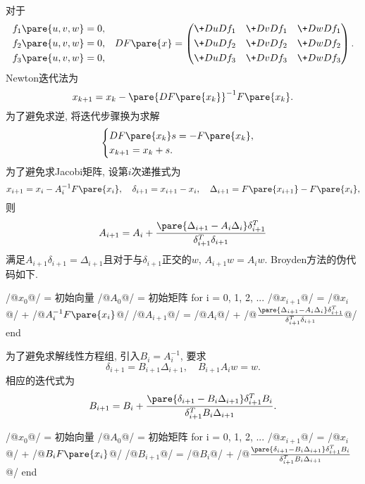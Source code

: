 \documentclass{ctexart}
\begin{document}
对于
\[ \begin{aligned}
    f_1\pare{u,v,w} & = 0, \\
    f_2\pare{u,v,w} & = 0, \\
    f_3\pare{u,v,w} & = 0,
\end{aligned}\quad DF\pare{x} = \left(\begin{aligned}
    \+DuD{f_1} && \+DvD{f_1} && \+DwD{f_1} \\
    \+DuD{f_2} && \+DvD{f_2} && \+DwD{f_2} \\
    \+DuD{f_3} && \+DvD{f_3} && \+DwD{f_3} \\
\end{aligned}\right). \]
Newton迭代法为
\[ x_{k+1} = x_k - \pare{DF\pare{x_k}}^{-1}F\pare{x_k}. \]
为了避免求逆, 将迭代步骤换为求解
\[ \begin{cases}
    DF\pare{x_k}s = -F\pare{x_k},\\
    x_{k+1} = x_k + s.
\end{cases} \]
为了避免求Jacobi矩阵, 设第$i$次递推式为
\[ x_{i+1} = x_i - A_i^{-1}F\pare{x_i},\quad \delta_{i+1} = x_{i+1} - x_i,\quad \Delta_{i+1} = F\pare{x_{i+1}} - F\pare{x_i}, \]
则
\[ A_{i+1} = A_i + \frac{\pare{\Delta_{i+1} - A_i\Delta_i}\delta^T_{i+1}}{\delta_{i+1}^T\delta_{i+1}} \]
满足$A_{i+1}\delta_{i+1} = \Delta_{i+1}$且对于与$\delta_{i+1}$正交的$w$, $A_{i+1}w = A_iw$. Broyden方法的伪代码如下.
\begin{matlablst}
/@$x_0$@/ = 初始向量
/@$A_0$@/ = 初始矩阵
for i = 0, 1, 2, ...
    /@$x_{i+1}$@/ = /@$x_i$@/ + /@$A_i^{-1}F\pare{x_i}$@/
    /@$A_{i+1}$@/ = /@$A_i$@/ + /@$\frac{\pare{\Delta_{i+1} - A_i\Delta_i}\delta^T_{i+1}}{\delta_{i+1}^T\delta_{i+1}}$@/
end
\end{matlablst}
为了避免求解线性方程组, 引入$B_i=A_i^{-1}$, 要求
\[ \delta_{i+1} = B_{i+1}\Delta_{i+1},\quad B_{i+1}A_iw = w. \]
相应的迭代式为
\[ B_{i+1} = B_i + \frac{\pare{\delta_{i+1} - B_i\Delta_{i+1}}\delta_{i+1}^TB_i}{\delta_{i+1}^TB_i\Delta_{i+1}}. \]
\begin{matlablst}
/@$x_0$@/ = 初始向量
/@$A_0$@/ = 初始矩阵
for i = 0, 1, 2, ...
    /@$x_{i+1}$@/ = /@$x_i$@/ + /@$B_iF\pare{x_i}$@/
    /@$B_{i+1}$@/ = /@$B_i$@/ + /@$\frac{\pare{\delta_{i+1} - B_i\Delta_{i+1}}\delta_{i+1}^TB_i}{\delta_{i+1}^TB_i\Delta_{i+1}}$@/
end
\end{matlablst}



\end{document}
